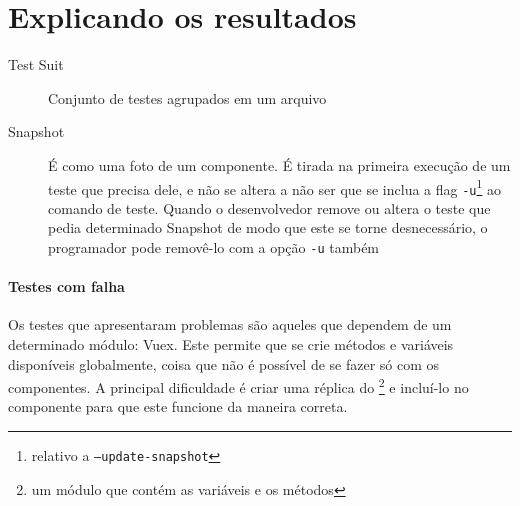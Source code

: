 \section{Explicando os resultados}
\label{sec:results}

\begin{description}
    \item[Test Suit] Conjunto de testes agrupados em um arquivo
    \item[Snapshot] É como uma foto de um componente.
    É tirada na primeira execução de um teste que precisa dele, e não se altera a não ser que se inclua
    a flag \texttt{-u}\footnote{relativo a \texttt{--update-snapshot}} ao comando de teste.
    Quando o desenvolvedor remove ou altera o teste que pedia determinado Snapshot de modo que este se torne
    desnecessário, o programador pode removê-lo com a opção \texttt{-u} também
\end{description}

\paragraph{Testes com falha} Os testes que apresentaram problemas são aqueles que dependem de um determinado
módulo: Vuex.
Este permite que se crie métodos e variáveis disponíveis globalmente, coisa que não é possível de se fazer
só com os componentes.
A principal dificuldade é criar uma réplica do \footnote{um módulo que contém as variáveis e os métodos}
e incluí-lo no componente para que este funcione da maneira correta.